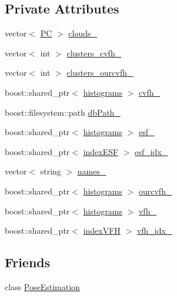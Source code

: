 \subsection*{Private Attributes}
\begin{DoxyCompactItemize}
\item 
vector$<$ \hyperlink{group__Definitions_ga62eb21fcfa3189c5de50fb62a2a7a79e}{P\-C} $>$ \hyperlink{classPoseDB_a6c324c00cf5ce2d6370567891170ba68}{clouds\-\_\-}
\item 
vector$<$ int $>$ \hyperlink{classPoseDB_a769672c08a62f8f6fc4fcf5f192e10cd}{clusters\-\_\-cvfh\-\_\-}
\item 
vector$<$ int $>$ \hyperlink{classPoseDB_acad0fbd4acff036f4dad3bfe796d2f1d}{clusters\-\_\-ourcvfh\-\_\-}
\item 
boost\-::shared\-\_\-ptr$<$ \hyperlink{group__Definitions_ga136493056b2eaf642f660e6a45a62991}{histograms} $>$ \hyperlink{classPoseDB_a64f15c76d07faed58d44fa73fe8081f2}{cvfh\-\_\-}
\item 
boost\-::filesystem\-::path \hyperlink{classPoseDB_ad1e3c1001be37bde48faa6502370494b}{db\-Path\-\_\-}
\item 
boost\-::shared\-\_\-ptr$<$ \hyperlink{group__Definitions_ga136493056b2eaf642f660e6a45a62991}{histograms} $>$ \hyperlink{classPoseDB_a658d2785a7e8f59466993864addbeb20}{esf\-\_\-}
\item 
boost\-::shared\-\_\-ptr$<$ \hyperlink{group__Definitions_ga3f45d3216269cf676ea864ae3bfcc446}{index\-E\-S\-F} $>$ \hyperlink{classPoseDB_ae19c149b38112855a937364747edefd5}{esf\-\_\-idx\-\_\-}
\item 
vector$<$ string $>$ \hyperlink{classPoseDB_a2870a93aa6304528109ce29204c95f51}{names\-\_\-}
\item 
boost\-::shared\-\_\-ptr$<$ \hyperlink{group__Definitions_ga136493056b2eaf642f660e6a45a62991}{histograms} $>$ \hyperlink{classPoseDB_a1a7c85d9cb1c33e27abe73f7d61aef6d}{ourcvfh\-\_\-}
\item 
boost\-::shared\-\_\-ptr$<$ \hyperlink{group__Definitions_ga136493056b2eaf642f660e6a45a62991}{histograms} $>$ \hyperlink{classPoseDB_ab0d34fd8b0fc5f74e2b7fc5261fdab8e}{vfh\-\_\-}
\item 
boost\-::shared\-\_\-ptr$<$ \hyperlink{group__Definitions_gacea1a4bf0f6b886a58ff00ff9cb54b34}{index\-V\-F\-H} $>$ \hyperlink{classPoseDB_a166e65f9bf6e0e268ae8e082e43fc242}{vfh\-\_\-idx\-\_\-}
\end{DoxyCompactItemize}
\subsection*{Friends}
\begin{DoxyCompactItemize}
\item 
class \hyperlink{classPoseDB_acc93828d970ba58835be2e8221c7a669}{Pose\-Estimation}
\end{DoxyCompactItemize}


